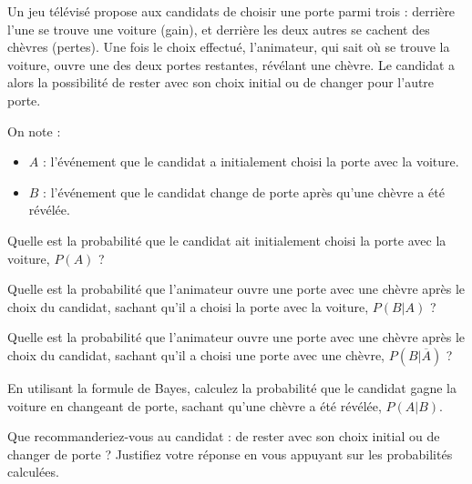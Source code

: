 \documentclass[11pt]{article}
\begin{document}
\begin{exercice}
Un jeu télévisé propose aux candidats de choisir une porte parmi trois : derrière l'une se trouve une voiture (gain), et derrière les deux autres se cachent des chèvres (pertes). Une fois le choix effectué, l'animateur, qui sait où se trouve la voiture, ouvre une des deux portes restantes, révélant une chèvre. Le candidat a alors la possibilité de rester avec son choix initial ou de changer pour l'autre porte.

On note :
\begin{itemize}
\item \( A \) : l'événement que le candidat a initialement choisi la
  porte avec la voiture.
\item   \( B \) : l'événement que le candidat change
  de porte après qu'une chèvre a été révélée.
\end{itemize}

\begin{enu}
\item Quelle est la probabilité que le candidat ait initialement choisi la porte avec la voiture, \( P(A) \) ?
\item Quelle est la probabilité que l'animateur ouvre une porte avec une chèvre après le choix du candidat, sachant qu'il a choisi la porte avec la voiture, \( P(B|A) \) ?
\item Quelle est la probabilité que l'animateur ouvre une porte avec une chèvre après le choix du candidat, sachant qu'il a choisi une porte avec une chèvre, \( P(B|\overline{A}) \) ?
\item En utilisant la formule de Bayes, calculez la probabilité que le candidat gagne la voiture en changeant de porte, sachant qu'une chèvre a été révélée, \( P(A|B) \).
\item Que recommanderiez-vous au candidat : de rester avec son choix initial ou de changer de porte ? Justifiez votre réponse en vous appuyant sur les probabilités calculées.
\end{enu}
\end{exercice}
\end{document}
